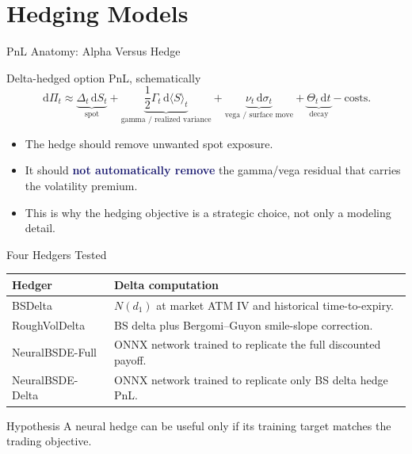 \documentclass[11pt,aspectratio=169]{beamer}
\newcommand{\dd}{\,\mathrm{d}}
\newcommand{\1}{\mathbf{1}}
\newcommand{\claim}[1]{\textcolor{midnightblue}{\textbf{#1}}}
\begin{document}
\section{Hedging Models}

\begin{frame}{PnL Anatomy: Alpha Versus Hedge}
    \small
    \begin{block}{Delta-hedged option PnL, schematically}
    \[
        \dd \Pi_t
        \approx
        \underbrace{\Delta_t \dd S_t}_{\text{spot}}
        +
        \underbrace{\frac12 \Gamma_t \dd \langle S\rangle_t}_{\text{gamma / realized variance}}
        +
        \underbrace{\nu_t \dd \sigma_t}_{\text{vega / surface move}}
        +
        \underbrace{\Theta_t \dd t}_{\text{decay}}
        -
        \mathrm{costs}.
    \]
    \end{block}
    \begin{itemize}
        \item The hedge should remove unwanted spot exposure.
        \item It should \claim{not automatically remove} the gamma/vega residual that carries the volatility premium.
        \item This is why the hedging objective is a strategic choice, not only a modeling detail.
    \end{itemize}
\end{frame}

\begin{frame}{Four Hedgers Tested}
    \small
    \begin{center}
    \renewcommand{\arraystretch}{1.18}
    \begin{tabular}{p{}p{}}
    \toprule
    \textbf{Hedger} & \textbf{Delta computation} \\
    \midrule
    BSDelta & $N(d_1)$ at market ATM IV and historical time-to-expiry. \\
    RoughVolDelta & BS delta plus Bergomi--Guyon smile-slope correction. \\
    NeuralBSDE-Full & ONNX network trained to replicate the full discounted payoff. \\
    NeuralBSDE-Delta & ONNX network trained to replicate only BS delta hedge PnL. \\
    \bottomrule
    \end{tabular}
    \end{center}
    \vspace{4pt}
    \begin{alertblock}{Hypothesis}
    A neural hedge can be useful only if its training target matches the trading objective.
    \end{alertblock}
\end{frame}
\end{document}
